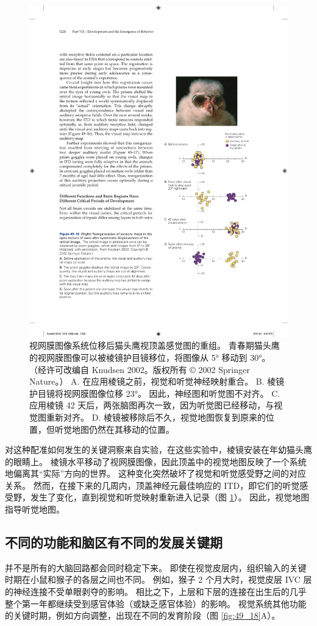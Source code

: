 \begin{figure}[htbp]
	\centering
	\includegraphics[width=0.5\linewidth]{chap49/fig_49_16}
	\caption{视网膜图像系统位移后猫头鹰视顶盖感觉图的重组。 青春期猫头鹰的视网膜图像可以被棱镜护目镜移位，将图像从 5° 移动到 30°。 （经许可改编自 Knudsen 2002。版权所有 © 2002 Springer Nature。） A. 在应用棱镜之前，视觉和听觉神经映射重合。 B. 棱镜护目镜将视网膜图像位移 23°。 因此，神经图和听觉图不对齐。 C. 应用棱镜 42 天后，两张脑图再次一致，因为听觉图已经移动，与视觉图重新对齐。 D. 棱镜被移除后不久，视觉地图恢复到原来的位置，但听觉地图仍然在其移动的位置。}
	\label{fig:49_16}
\end{figure}

对这种配准如何发生的关键洞察来自实验，在这些实验中，棱镜安装在年幼猫头鹰的眼睛上。 棱镜水平移动了视网膜图像，因此顶盖中的视觉地图反映了一个系统地偏离其“实际”方向的世界。 这种变化突然破坏了视觉和听觉感受野之间的对应关系。 然而，在接下来的几周内，顶盖神经元最佳响应的 ITD，即它们的听觉感受野，发生了变化，直到视觉和听觉映射重新进入记录（图 \ref{fig:49_16}）。 因此，视觉地图指导听觉地图。

\subsection{不同的功能和脑区有不同的发展关键期}
并不是所有的大脑回路都会同时稳定下来。 即使在视觉皮层内，组织输入的关键时期在小鼠和猴子的各层之间也不同。 例如，猴子 2 个月大时，视觉皮层 IVC 层的神经连接不受单眼剥夺的影响。 相比之下，上层和下层的连接在出生后的几乎整个第一年都继续受到感官体验（或缺乏感官体验）的影响。 
视觉系统其他功能的关键时期，例如方向调整，出现在不同的发育阶段（图 \ref{fig:49_18}A）。

